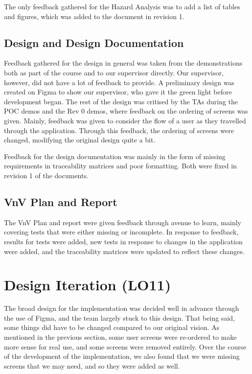 \documentclass{article}
\begin{document}
The only feedback gathered for the Hazard Analysis was to add a list of tables and figures, which was added to the document in revision 1.

\subsection{Design and Design Documentation}

Feedback gathered for the design in general was taken from the demonstrations both as part of the course and to our supervisor directly. Our supervisor, however, did not have a lot of feedback to provide. A preliminary design was created on Figma to show our supervisor, who gave it the green light before development began. The rest of the design was critised by the TAs during the POC demos and the Rev 0 demos, where feedback on the ordering of screens was given. Mainly, feedback was given to consider the flow of a user as they travelled through the application. Through this feedback, the ordering of screens were changed, modifying the original design quite a bit.

Feedback for the design documentation was mainly in the form of missing requirements in traceability matrices and poor formatting. Both were fixed in revision 1 of the documents.

\subsection{VnV Plan and Report}

The VnV Plan and report were given feedback through avenue to learn, mainly covering tests that were either missing or incomplete. In response to feedback, results for tests were added, new tests in response to changes in the application were added, and the traceability matrices were updated to reflect these changes.

\section{Design Iteration (LO11)}


The broad design for the implementation was decided well in advance through the use of Figma, and the team largely stuck to this design. That being said, some things did have to be changed compared to our original vision. As mentioned in the previous section, some user screens were re-ordered to make more sense for real use, and some screens were removed entirely. Over the course of the development of the implementation, we also found that we were missing screens that we may need, and so they were added as well.
\end{document}

